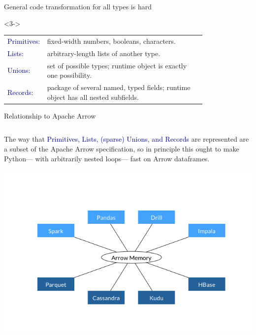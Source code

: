 \documentclass[aspectratio=169]{beamer}
\begin{document}
\begin{frame}{General code transformation for all types is hard}
\vspace{0.5 cm}
\large


\vspace{0.25 cm}
\begin{uncoverenv}<3->
\renewcommand{\arraystretch}{2}
\begin{tabular}{l p{0.8\linewidth}}
\textcolor{darkblue}{{\Huge P}{\LARGE rimitives:}} & fixed-width numbers, booleans, characters. \\
\textcolor{darkblue}{{\Huge L}{\LARGE ists:}} & arbitrary-length lists of another type. \\
\textcolor{darkblue}{{\Huge U}{\LARGE nions:}} & set of possible types; runtime object is exactly one possibility. \\
\textcolor{darkblue}{{\Huge R}{\LARGE ecords:}} & package of several named, typed fields; runtime object has all nested subfields.
\end{tabular}
\end{uncoverenv}

\normalsize
{}

\vspace{0.2 cm}
\end{frame}

\begin{frame}{Relationship to Apache Arrow}
\large

\begin{columns}
\begin{center}
The way that \textcolor{darkblue}{Primitives, Lists, (sparse) Unions, and Records} are represented are a subset of the Apache Arrow specification, so in principle this ought to make Python--- with arbitrarily nested loops--- fast on Arrow dataframes.

\vspace{-0.75 cm}
\includegraphics[width=0.65\linewidth]{apache-arrow.png}

\vspace{-0.75 cm}
\end{center}
\end{columns}
\end{frame}
\end{document}

